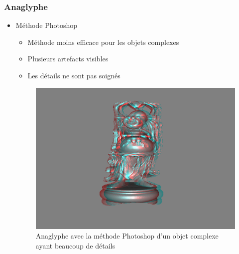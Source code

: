 \documentclass{beamer}
\begin{document}
%
\begin{frame}
\frametitle{Anaglyphe}
\begin{itemize}[label=$\bullet$]
\item Méthode Photoshop \cite{stereoAnaglyph}
	\begin{itemize}[label=$\circ$]
	\item Méthode moins efficace pour les objets complexes 
	\item Plusieurs artefacts visibles
	\item Les détails ne sont pas soignés
	\end{itemize}
\begin{figure}
\centering
\includegraphics[scale=0.3]{happy_photoshop.png}
\caption{Anaglyphe avec la méthode Photoshop d'un objet complexe ayant beaucoup de détails }
\end{figure}
	
\end{itemize}

\end{frame}
\end{document}
